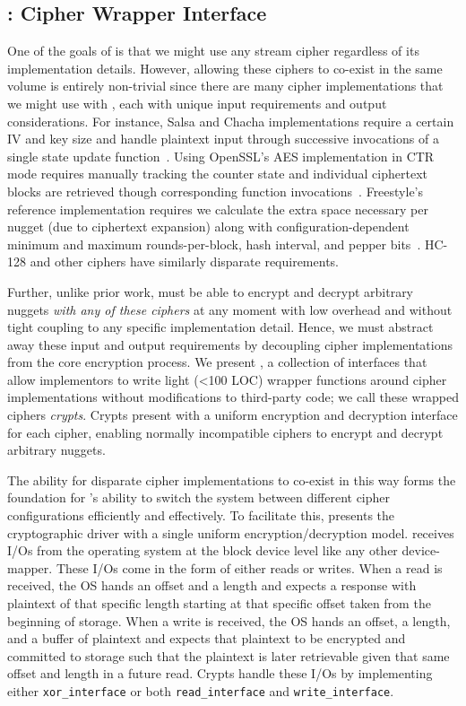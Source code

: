 \subsection{\sysB: Cipher Wrapper Interface}\label{subsec:des-crypts}

One of the goals of \sys is that we might use any stream cipher regardless of
its implementation details. However, allowing these ciphers to co-exist in the
same volume is entirely non-trivial since there are many cipher implementations
that we might use with \sys, each with unique input requirements and output
considerations. For instance, Salsa and Chacha implementations require a certain
IV and key size and handle plaintext input through successive invocations of a
single state update function~\cite{Floodyberry}. Using OpenSSL's AES
implementation in CTR mode requires manually tracking the counter state and
individual ciphertext blocks are retrieved though corresponding function
invocations~\cite{OpenSSL}. Freestyle's reference implementation requires we
calculate the extra space necessary per nugget (due to ciphertext expansion)
along with configuration-dependent minimum and maximum rounds-per-block, hash
interval, and pepper bits~\cite{Freestyle}. HC-128 and other ciphers have
similarly disparate requirements.

Further, unlike prior work, \sys must be able to encrypt and decrypt arbitrary
nuggets \emph{with any of these ciphers} at any moment with low overhead and
without tight coupling to any specific implementation detail. Hence, we must
abstract away these input and output requirements by decoupling cipher
implementations from the core encryption process. We present \sysB, a collection
of interfaces that allow implementors to write light (<100 LOC) wrapper
functions around cipher implementations without modifications to third-party
code; we call these wrapped ciphers {\em crypts}. Crypts present \sys with a
uniform encryption and decryption interface for each cipher, enabling normally
incompatible ciphers to encrypt and decrypt arbitrary nuggets.

The ability for disparate cipher implementations to co-exist in this way forms
the foundation for \sys's ability to switch the system between different cipher
configurations efficiently and effectively. To facilitate this, \sysB presents
the cryptographic driver with a single uniform encryption/decryption model. \sys
receives I/Os from the operating system at the block device level like any other
device-mapper. These I/Os come in the form of either reads or writes. When a
read is received, the OS hands \sys an offset and a length and expects a
response with plaintext of that specific length starting at that specific offset
taken from the beginning of storage. When a write is received, the OS hands \sys
an offset, a length, and a buffer of plaintext and expects that plaintext to be
encrypted and committed to storage such that the plaintext is later retrievable
given that same offset and length in a future read. Crypts handle these I/Os by
implementing either \texttt{xor\_interface} or both \texttt{read\_interface} and
\texttt{write\_interface}.


